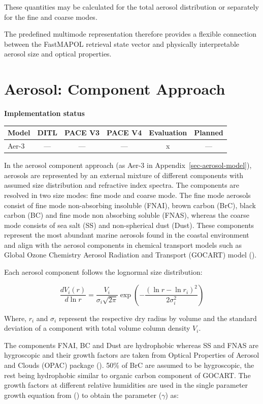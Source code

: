 \documentclass[
  11pt,
  letterpaper,
]{scrreprt}
\begin{document}
These quantities may be calculated for the total aerosol distribution or
separately for the fine and coarse modes.

The predefined multimode representation therefore provides a flexible
connection between the FastMAPOL retrieval state vector and physically
interpretable aerosol size and optical properties.

\chapter{Aerosol: Component Approach}\label{sec-aerosol-component}

\textbf{Implementation status}

\begin{longtable}[]{@{}lccccc@{}}
\toprule\noalign{}
Model & DITL & PACE V3 & PACE V4 & Evaluation & Planned \\
\midrule\noalign{}
\endhead
\bottomrule\noalign{}
\endlastfoot
Aer-3 & --- & --- & --- & x & --- \\
\end{longtable}

In the aerosol component approach (as Aer-3 in
Appendix~\ref{sec-aerosol-model}), aerosols are represented by an
external mixture of different components with assumed size distribution
and refractive index spectra. The components are resolved in two size
modes: fine mode and coarse mode. The fine mode aerosols consist of fine
mode non-absorbing insoluble (FNAI), brown carbon (BrC), black carbon
(BC) and fine mode non absorbing soluble (FNAS), whereas the coarse mode
consists of sea salt (SS) and non-spherical dust (Dust). These
components represent the most abundant marine aerosols found in the
coastal environment and align with the aerosol components in chemical
transport models such as Global Ozone Chemistry Aerosol Radiation and
Transport (GOCART) model ().

Each aerosol component follows the lognormal size distribution:

\[
\frac{dV_i(r)}{d\ln r} = \frac{V_i}{\sigma_i\sqrt{2\pi}} \exp \left( - \frac{(\ln r - \ln r_i)^2}{2\sigma_i^2} \right)
\]

Where, \(r_i\) and \(\sigma_i\) represent the respective dry radius by
volume and the standard deviation of a component with total volume
column density \(V_i\).

The components FNAI, BC and Dust are hydrophobic whereas SS and FNAS are
hygroscopic and their growth factors are taken from Optical Properties
of Aerosol and Clouds (OPAC) package (). 50\% of BrC are assumed to be hygroscopic, the rest being
hydrophobic similar to organic carbon component of GOCART. The growth
factors at different relative humidities are used in the single
parameter growth equation from () to obtain the parameter (\(\gamma\)) as:
\end{document}
